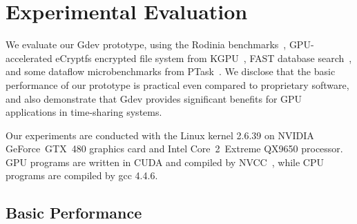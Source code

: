 \vspace{-0.25em}
\section{Experimental Evaluation}
\label{sec:evaluation}
\vspace{-0.25em}

We evaluate our Gdev prototype, using the Rodinia
benchmarks~\cite{Che_IISWC09}, GPU-accelerated eCryptfs encrypted
file system from KGPU~\cite{Sun_SYSTOR12}, FAST database
search~\cite{Kim_SIGMOD10}, and some dataflow
microbenchmarks from PTask~\cite{Rossbach_SOSP11}.
We disclose that the basic performance of our prototype is practical
even compared to proprietary software, and also demonstrate that Gdev
provides significant benefits for GPU applications in time-sharing
systems.

Our experiments are conducted with the Linux kernel 2.6.39 on NVIDIA
GeForce~GTX~480 graphics card and Intel Core~2~Extreme QX9650 processor.
GPU programs are written in CUDA and compiled by NVCC~\cite{CUDA40},
while CPU programs are compiled by gcc 4.4.6.

\vspace{-0.25em}
\subsection{Basic Performance}
\vspace{-0.25em}

